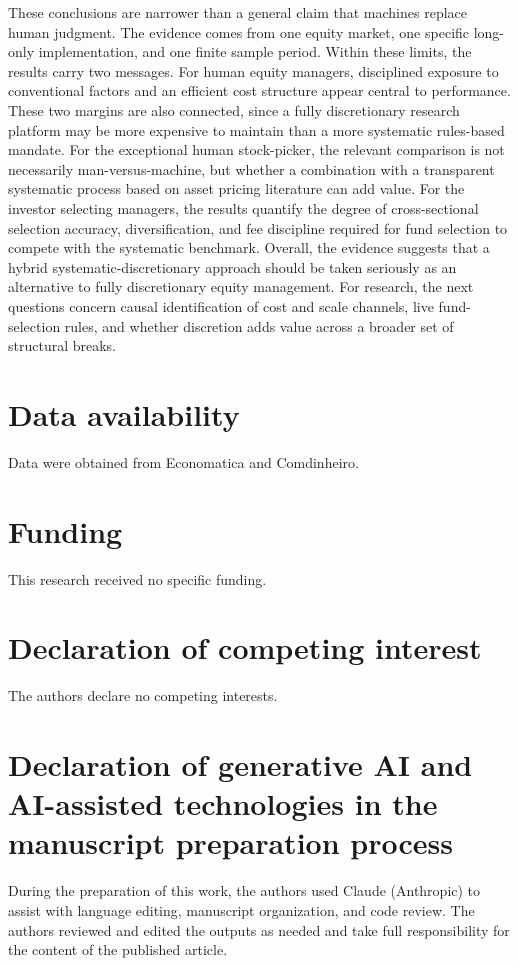 \documentclass[preprint,12pt,authoryear]{elsarticle}
\begin{document}
These conclusions are narrower than a general claim that machines replace human judgment. The evidence comes from one equity market, one specific long-only implementation, and one finite sample period. Within these limits, the results carry two messages. For human equity managers, disciplined exposure to conventional factors and an efficient cost structure appear central to performance. These two margins are also connected, since a fully discretionary research platform may be more expensive to maintain than a more systematic rules-based mandate. For the exceptional human stock-picker, the relevant comparison is not necessarily man-versus-machine, but whether a combination with a transparent systematic process based on asset pricing literature can add value. For the investor selecting managers, the results quantify the degree of cross-sectional selection accuracy, diversification, and fee discipline required for fund selection to compete with the systematic benchmark. Overall, the evidence suggests that a hybrid systematic-discretionary approach should be taken seriously as an alternative to fully discretionary equity management. For research, the next questions concern causal identification of cost and scale channels, live fund-selection rules, and whether discretion adds value across a broader set of structural breaks.

\section*{Data availability}
Data were obtained from Economatica and Comdinheiro.

\section*{Funding}
This research received no specific funding.

\section*{Declaration of competing interest}
The authors declare no competing interests.

\section*{Declaration of generative AI and AI-assisted technologies in the manuscript preparation process}

During the preparation of this work, the authors used Claude (Anthropic) to assist with language editing, manuscript organization, and code review. The authors reviewed and edited the outputs as needed and take full responsibility for the content of the published article.
\end{document}
